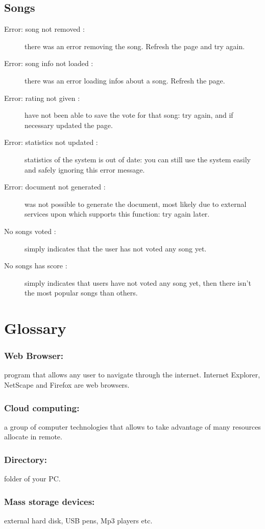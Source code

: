 \section{Songs}
\begin{description}
	\item[Error: song not removed :] there was an error removing the song.
	Refresh the page and try again.
	\item[Error: song info not loaded :] there was an error loading infos about a
	song. Refresh the page.
	\item[Error: rating not given :] have not been able to save the vote for that
	song: try again, and if necessary updated the page.
	\item[Error: statistics not updated :] statistics of the system is out of date:
	you can still use the system easily and safely ignoring this error message.
	\item[Error: document not generated :] was not possible to generate the
	document, most likely due to external services upon which supports this
	function: try again later.
	\item[No songs voted :] simply indicates that the user has not voted any song
	yet.
	\item[No songs has score :] simply indicates that users have not voted any song
	yet, then there isn't the most popular songs than others.
\end{description}

\chapter{Glossary}
\thispagestyle{fancy}

\subsection*{Web Browser:} program that allows any user to navigate through the
internet. Internet Explorer, NetScape and Firefox are web browsers. 
\subsection*{Cloud computing:} a group of computer technologies that allows to
take advantage of many resources allocate in remote. 
\subsection*{Directory:}
folder of your PC. 
\subsection*{Mass storage devices:} external hard disk, USB pens, Mp3 players
etc. 
